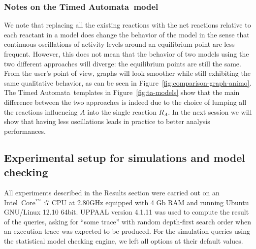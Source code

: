\documentclass{bmcart}
\def\tas{Timed Automata}
\begin{document}
\subsubsection*{Notes on the \tas\ model}\label{sec:ta-notes}
We note that replacing all the existing reactions with the net reactions relative to each
reactant in a model does change the behavior of the model in the sense that continuous oscillations
of activity levels around an equilibrium point are less frequent. However, this does not mean that the
behavior of two models using the two different approaches will diverge: the equilibrium points
are still the same.
From the user's point of view, graphs will look smoother while still exhibiting the same qualitative behavior,
as can be seen in Figure~\ref{fig:comparison-graph-animo}.
The \tas\ templates in Figure~\ref{fig:ta-models} show that the main difference between the two approaches
is indeed due to the choice of lumping all the reactions influencing $A$ into the single
reaction $R_A$.
In the next session we will show that having less oscillations leads in practice to better analysis performances.


\subsection*{Experimental setup for simulations and model checking}
All experiments described in the Results section
were carried out on an Intel\circledR\ Core$^{\mbox{\scriptsize\texttrademark}}$ i7 CPU at 2.80GHz equipped with 4 Gb RAM
and running Ubuntu GNU/Linux 12.10 64bit.
UPPAAL version 4.1.11 was used to compute the result of the queries, asking for ``some trace'' with random depth-first search order
when an execution trace was expected to be produced. For the simulation queries using the statistical model checking engine, we left
all options at their default values.










\end{document}
